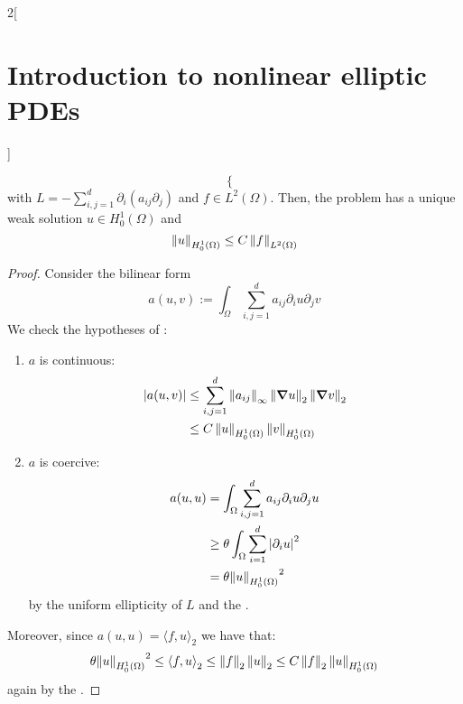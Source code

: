 \documentclass[../../../main_math.tex]{subfiles}
\begin{document}
\begin{multicols}{2}[\section{Introduction to nonlinear elliptic PDEs}]
\begin{proposition}
$$\begin{cases}
      \end{cases}
    $$
    with $L=-\sum_{i,j=1}^d\partial_i(a_{ij}\partial_j)$ and $f\in L^2(\Omega)$. Then, the problem has a unique weak solution $u\in H_0^1(\Omega)$ and
    $$
      \left\|u\right\|_{H_0^1(\Omega)}\leq C\left\|f\right\|_{L^2(\Omega)}
    $$
  \end{proposition}
  \begin{proof}
    Consider the bilinear form $$
      a(u,v):=\int_\Omega\sum_{i,j=1}^da_{ij}\partial_iu\partial_jv
    $$
    We check the hypotheses of :
    \begin{enumerate}
      \item $a$ is continuous:
            \begin{align*}
              \abs{a(u,v)} & \leq \sum_{i,j=1}^d\left\|a_{ij}\right\|_{\infty}\left\|\grad u\right\|_{2}\left\|\grad v\right\|_{2} \\
                           & \leq C\left\|u\right\|_{H_0^1(\Omega)}\left\|v\right\|_{H_0^1(\Omega)}
            \end{align*}
      \item $a$ is coercive:
            \begin{align*}
              a(u,u) & =\int_\Omega\sum_{i,j=1}^da_{ij}\partial_iu\partial_ju   \\
                     & \geq \theta \int_\Omega\sum_{i=1}^d{\abs{\partial_iu}}^2 \\
                     & =\theta {\left\|u\right\|_{H_0^1(\Omega)}}^2
            \end{align*}
            by the uniform ellipticity of $L$ and the .
    \end{enumerate}
    Moreover, since $ a(u,u)={\langle f,u\rangle}_2$ we have that:
    \begin{align*}
      \theta {\left\|u\right\|_{H_0^1(\Omega)}}^2\leq {\langle f,u\rangle}_2\leq \left\|f\right\|_2\left\|u\right\|_{2}\leq C \left\|f\right\|_2\left\|u\right\|_{H_0^1(\Omega)}
    \end{align*}
    again by the .
  \end{proof}

\end{multicols}
\end{document}
